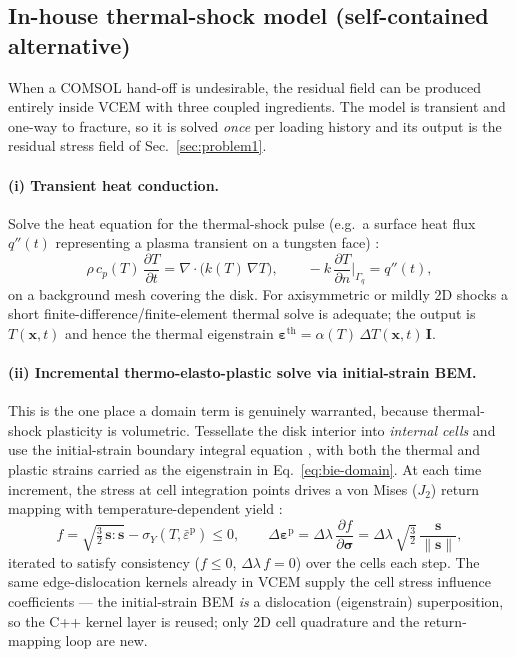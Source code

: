 \documentclass[11pt]{article}
\newcommand{\xvec}{\mathbf{x}}
\newcommand{\bdry}{\Gamma}
\newcommand{\epspl}{\bm{\varepsilon}^{\mathrm{p}}}
\newcommand{\sig}{\bm{\sigma}}
\newcommand{\eps}{\bm{\varepsilon}}
\begin{document}
\subsection{In-house thermal-shock model (self-contained alternative)}
\label{sec:inhouse}

When a COMSOL hand-off is undesirable, the residual field can be produced
entirely inside VCEM with three coupled ingredients. The model is transient and
one-way to fracture, so it is solved \emph{once} per loading history and its
output is the residual stress field of Sec.~\ref{sec:problem1}.

\paragraph{(i) Transient heat conduction.} Solve the heat equation for the
thermal-shock pulse (e.g.\ a surface heat flux $q''(t)$ representing a plasma
transient on a tungsten face) \citep{carslaw_jaeger1959}:
\begin{equation}
\rho\,c_p(T)\,\frac{\partial T}{\partial t}
= \nabla\!\cdot\!\big(k(T)\,\nabla T\big),
\qquad
-k\,\frac{\partial T}{\partial n}\Big|_{\bdry_q}=q''(t),
\label{eq:heat}
\end{equation}
on a background mesh covering the disk. For axisymmetric or mildly 2D shocks a
short finite-difference/finite-element thermal solve is adequate; the output is
$T(\xvec,t)$ and hence the thermal eigenstrain
$\eps^{\mathrm{th}}=\alpha(T)\,\Delta T(\xvec,t)\,\mathbf I$.

\paragraph{(ii) Incremental thermo-elasto-plastic solve via initial-strain BEM.}
This is the one place a domain term is genuinely warranted, because
thermal-shock plasticity is volumetric. Tessellate the disk interior into
\emph{internal cells} and use the initial-strain boundary integral equation
\citep{telles1983,brebbia1984,aliabadi2002}, with both the thermal and plastic
strains carried as the eigenstrain in Eq.~\eqref{eq:bie-domain}. At each time
increment, the stress at cell integration points drives a von Mises
($J_2$) return mapping with temperature-dependent yield
\citep{simo_taylor1985}:
\begin{equation}
f=\sqrt{\tfrac{3}{2}\,\mathbf s\!:\!\mathbf s}-\sigma_Y(T,\bar\varepsilon^{\mathrm p})\le 0,
\qquad
\Delta\epspl=\Delta\lambda\,\frac{\partial f}{\partial \sig}
=\Delta\lambda\,\sqrt{\tfrac{3}{2}}\,\frac{\mathbf s}{\|\mathbf s\|},
\label{eq:j2-inhouse}
\end{equation}
iterated to satisfy consistency ($f\le0$, $\Delta\lambda\,f=0$) over the cells
each step. The same edge-dislocation kernels already in VCEM supply the cell
stress influence coefficients --- the initial-strain BEM \emph{is} a dislocation
(eigenstrain) superposition, so the C++ kernel layer is reused; only 2D cell
quadrature and the return-mapping loop are new.
\end{document}
